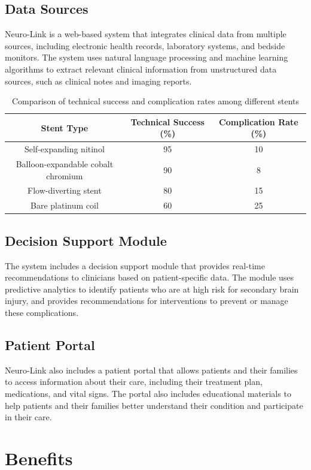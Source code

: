 \documentclass{article}
\begin{document}
\subsection{Data Sources}

Neuro-Link is a web-based system that integrates clinical data from multiple sources, including electronic health records, laboratory systems, and bedside monitors. The system uses natural language processing and machine learning algorithms to extract relevant clinical information from unstructured data sources, such as clinical notes and imaging reports.
\begin{table}[ht]
\centering
\caption{Comparison of technical success and complication rates among different stents}
\begin{tabular}{|c|c|c|}
\hline
Stent Type & Technical Success (\%) & Complication Rate (\%) \\ \hline
Self-expanding nitinol & 95 & 10 \\
Balloon-expandable cobalt chromium & 90 & 8 \\
Flow-diverting stent & 80 & 15 \\
Bare platinum coil & 60 & 25 \\ \hline
\end{tabular}
\end{table}


\subsection{Decision Support Module}

The system includes a decision support module that provides real-time recommendations to clinicians based on patient-specific data. The module uses predictive analytics to identify patients who are at high risk for secondary brain injury, and provides recommendations for interventions to prevent or manage these complications.

\subsection{Patient Portal}

Neuro-Link also includes a patient portal that allows patients and their families to access information about their care, including their treatment plan, medications, and vital signs. The portal also includes educational materials to help patients and their families better understand their condition and participate in their care.

\section{Benefits}
\end{document}

